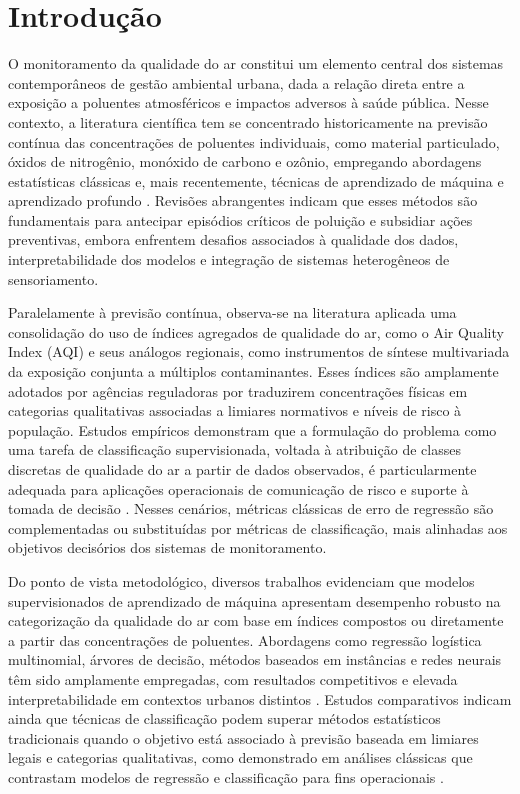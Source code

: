 \section{Introdução}

O monitoramento da qualidade do ar constitui um elemento central dos sistemas contemporâneos de gestão ambiental urbana, dada a relação direta entre a exposição a poluentes atmosféricos e impactos adversos à saúde pública. Nesse contexto, a literatura científica tem se concentrado historicamente na previsão contínua das concentrações de poluentes individuais, como material particulado, óxidos de nitrogênio, monóxido de carbono e ozônio, empregando abordagens estatísticas clássicas e, mais recentemente, técnicas de aprendizado de máquina e aprendizado profundo \cite{Bernacki2025}. Revisões abrangentes indicam que esses métodos são fundamentais para antecipar episódios críticos de poluição e subsidiar ações preventivas, embora enfrentem desafios associados à qualidade dos dados, interpretabilidade dos modelos e integração de sistemas heterogêneos de sensoriamento.

Paralelamente à previsão contínua, observa-se na literatura aplicada uma consolidação do uso de índices agregados de qualidade do ar, como o Air Quality Index (AQI) e seus análogos regionais, como instrumentos de síntese multivariada da exposição conjunta a múltiplos contaminantes. Esses índices são amplamente adotados por agências reguladoras por traduzirem concentrações físicas em categorias qualitativas associadas a limiares normativos e níveis de risco à população. Estudos empíricos demonstram que a formulação do problema como uma tarefa de classificação supervisionada, voltada à atribuição de classes discretas de qualidade do ar a partir de dados observados, é particularmente adequada para aplicações operacionais de comunicação de risco e suporte à tomada de decisão \cite{Hamami2022,Putra2020,Aram2023}. Nesses cenários, métricas clássicas de erro de regressão são complementadas ou substituídas por métricas de classificação, mais alinhadas aos objetivos decisórios dos sistemas de monitoramento.

Do ponto de vista metodológico, diversos trabalhos evidenciam que modelos supervisionados de aprendizado de máquina apresentam desempenho robusto na categorização da qualidade do ar com base em índices compostos ou diretamente a partir das concentrações de poluentes. Abordagens como regressão logística multinomial, árvores de decisão, métodos baseados em instâncias e redes neurais têm sido amplamente empregadas, com resultados competitivos e elevada interpretabilidade em contextos urbanos distintos \cite{Ali2022,Putra2020,Aram2023}. Estudos comparativos indicam ainda que técnicas de classificação podem superar métodos estatísticos tradicionais quando o objetivo está associado à previsão baseada em limiares legais e categorias qualitativas, como demonstrado em análises clássicas que contrastam modelos de regressão e classificação para fins operacionais \cite{athanasiadis2006classification}.

